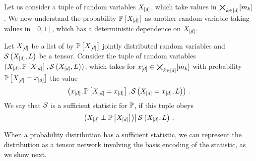 \subsect{\ComputationMechanism{}}


Let us consider a tuple of random variables $X_{[d]}$, which take values in $\bigtimes_{k\in[d]}[m_{k}]$.
We now understand the probability $\mathbb{P}\left[X_{[d]}\right]$ as another random variable taking values in $[0,1]$, which has a deterministic dependence on $X_{[d]}$.

\begin{definition}
    Let $X_{[d]}$ be a list of by $\mathbb{P}\left[X_{[d]}\right]$ jointly distributed random variables and $\mathcal{S}\left(X_{[d]},L\right)$ be a tensor.
    Consider the tuple of random variables $(X_{[d]},\mathbb{P}\left[X_{[d]}\right],\mathcal{S}\left(X_{[d]},L\right))$, which takes for $x_{[d]}\in\bigtimes_{k\in[d]}[m_{k}]$ with probability $\mathbb{P}\left[X_{[d]}=x_{[d]}\right]$ the value
    \begin{align*}
        \left(x_{[d]},\mathbb{P}\left[X_{[d]}=x_{[d]}\right],\mathcal{S}\left(X_{[d]}=x_{[d]},L\right)\right) \, .
    \end{align*}
    We say that $\mathcal{S}$ is a sufficient statistic for $\mathbb{P}$, if this tuple obeys
    \begin{align*}
        \left(X_{[d]}\perp\mathbb{P}\left[X_{[d]}\right]\middle)\right| \mathcal{S}\left(X_{[d]},L\right) \, .
    \end{align*}
\end{definition}

When a probability distribution has a sufficient statistic, we can represent the distribution as a tensor network involving the basis encoding of the statistic, as we show next.

